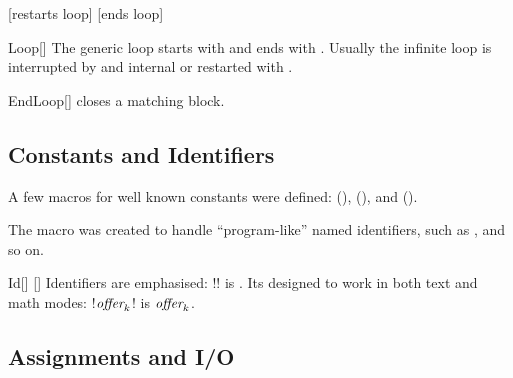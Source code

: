 \documentclass[a4paper, 11pt]{article}
\begin{document}
\begin{tcblisting}{}
    \begin{algorithmic}
        \Loop
                \Statep{\Continue}[restarts loop]
            \EndIf
                \Statep{\Break}[ends loop]
            \EndIf
        \EndLoop
    \end{algorithmic}
\end{tcblisting}

\begin{macro}{Loop}[]
    The generic loop starts with  and ends with . Usually the infinite loop is interrupted by and internal  or restarted with .

    \BlockOptionsText
\end{macro}

\begin{macro}{EndLoop}[]
     closes a matching  block.

    \MacroOptionsText
\end{macro}

\subsection{Constants and Identifiers}\label{sec:constants-and-identifiers}
A few macros for well known constants were defined:  (\True),  (\False), and  (\Nil).

The macro  was created to handle ``program-like'' named identifiers, such as ,  and so on.

\begin{macro}{Id}[]
    []
    Identifiers are emphasised: \latexinline!! is . Its designed to work in both text and math modes: \latexinline!$\emph{\rmfamily offer}_k$! is $\emph{\rmfamily offer}_k$.
\end{macro}

\subsection{Assignments and I/O}\label{sec:assignments-and-i/o}
\end{document}
